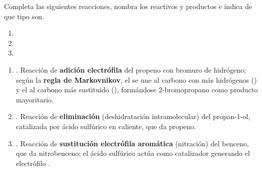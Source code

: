 \begin{exerciseEVAU}
    Completa las siguientes reacciones, nombra los reactivos y productos e indica de que tipo son.

    \begin{enumerate}[label=\letraminuscula]
        \item {} 
        \item {} 
        \item {} 
    \end{enumerate}

    \begin{solu}


        \begin{enumerate}[label=\letraminuscula]
            \item {}. Reacción de \textbf{adición electrófila} del propeno con bromuro de hidrógeno; según la \textbf{regla de Markovnikov}, el  se une al carbono con más hidrógenos () y el  al carbono más sustituido (), formándose 2-bromopropano como producto mayoritario.

            \item {}. Reacción de \textbf{eliminación} (deshidratación intramolecular) del propan-1-ol, catalizada por ácido sulfúrico en caliente, que da propeno.

            \item {}. Reacción de \textbf{sustitución electrófila aromática} (nitración) del benceno, que da nitrobenceno; el ácido sulfúrico actúa como catalizador generando el electrófilo .
        \end{enumerate}
    \end{solu}
\end{exerciseEVAU}

